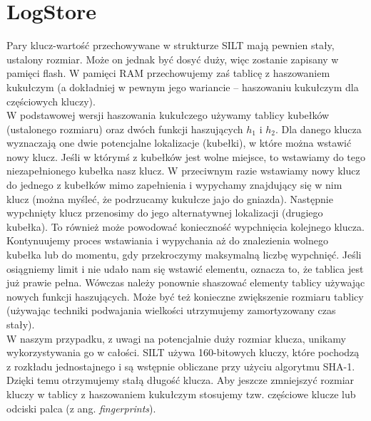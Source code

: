 \documentclass[declaration,shortabstract,masc]{iithesis}
\begin{document}
		\section{LogStore}
			Pary klucz-wartość przechowywane w strukturze SILT mają pewnien stały, ustalony rozmiar. Może on jednak być dosyć duży, więc zostanie zapisany w pamięci flash. W pamięci RAM przechowujemy zaś tablicę z haszowaniem kukułczym (a dokładniej w pewnym jego wariancie -- haszowaniu kukułczym dla częściowych kluczy).\\
			\indent W podstawowej wersji haszowania kukułczego używamy tablicy kubełków (ustalonego rozmiaru) oraz dwóch funkcji haszujących $h_1$ i $h_2$. Dla danego klucza wyznaczają one dwie potencjalne lokalizacje (kubełki), w które można wstawić nowy klucz. Jeśli w którymś z kubełków jest wolne miejsce, to wstawiamy do tego niezapełnionego kubełka nasz klucz. W przeciwnym razie wstawiamy nowy klucz do jednego z kubełków mimo zapełnienia i wypychamy znajdujący się w nim klucz (można myśleć, że podrzucamy kukułcze jajo do gniazda). Następnie wypchnięty klucz przenosimy do jego alternatywnej lokalizacji (drugiego kubełka). To również może powodować konieczność wypchnięcia kolejnego klucza. Kontynuujemy proces wstawiania i wypychania aż do znalezienia wolnego kubełka lub do momentu, gdy przekroczymy maksymalną liczbę wypchnięć. Jeśli osiągniemy limit i nie udało nam się wstawić elementu, oznacza to, że tablica jest już prawie pełna. Wówczas należy ponownie shaszować elementy tablicy używając nowych funkcji haszujących. Może być też konieczne zwiększenie rozmiaru tablicy (używając techniki podwajania wielkości utrzymujemy zamortyzowany czas stały).\\
			\indent W naszym przypadku, z uwagi na potencjalnie duży rozmiar klucza, unikamy wykorzystywania go w całości. SILT używa 160-bitowych kluczy, które pochodzą z rozkładu jednostajnego i są wstępnie obliczane przy użyciu algorytmu SHA-1. Dzięki temu otrzymujemy stałą długość klucza. Aby jeszcze zmniejszyć rozmiar kluczy w tablicy z haszowaniem kukułczym stosujemy tzw. częściowe klucze lub odciski palca (z ang. \textit{fingerprints}).\\
\end{document}
